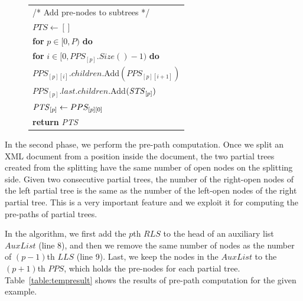 {\begin{figure}[!t]
\begin{tabular}{l}
 		\makebox[1em][r]{11:}\hspace{1 mm}  /* Add pre-nodes to subtrees */ \\
 		\makebox[1em][r]{12:}\hspace{1 mm} $PTS \leftarrow []$ \\
 		\makebox[1em][r]{13:}\hspace{1 mm} \textbf{for} $ p \in [0, P) $ \textbf{do}\\
 		\makebox[1em][r]{14:}\hspace{4 mm} \textbf{for} $ i \in [0, PPS_{[p]}.Size() - 1)$ \textbf{do} \\
 		\makebox[1em][r]{15:}\hspace{8 mm}   $PPS_{[p][i]}.children.$Add$(PPS_{[p][i+1]})$ \\
  		\makebox[1em][r]{16:}\hspace{4 mm} $PPS_{[p]}.last.children.$Add$(\mathit{STS}_{[p]})$ \\
 		\makebox[1em][r]{17:}\hspace{4 mm}   $\mathit{PTS}_{[p]} \leftarrow PPS_{[p][0]}$ \\
 		\makebox[1em][r]{18:}\hspace{1 mm} \textbf{return} \emph{PTS} \\
 		\hline
 	\end{tabular}
 \end{figure}
}

In the second phase, we perform the pre-path computation. Once we split an XML
document from a position inside the document, the two partial trees created from
the splitting have the same number of open nodes on the splitting side. Given
two consecutive partial trees, the number of the right-open nodes of the left
partial tree is the same as the number of the left-open nodes of the right
partial tree. This is a very important feature and we exploit it for computing
the pre-paths of partial trees.

In the algorithm, we first add the $p$th $RLS$ to the head of an auxiliary list
$AuxList$ (line 8), and then we remove the same number of nodes as the number of
$(p-1)$th $LLS$ (line 9). Last, we keep the nodes in the $AuxList$ to the
$(p+1)$th $PPS$, which holds the pre-nodes for each partial tree.
Table~\ref{table:tempresult} shows the results of pre-path computation for the
given example.

